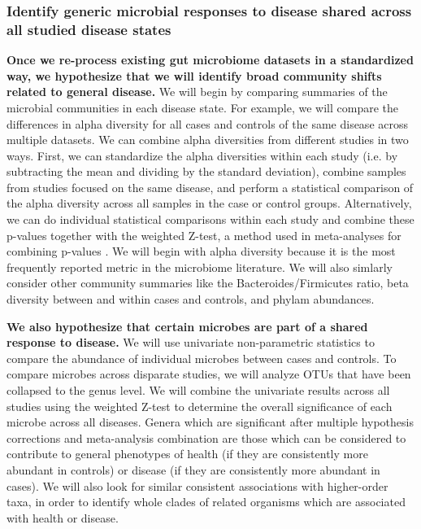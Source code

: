 \documentclass[12pt]{article}
\begin{document}
\subsubsection{Identify generic microbial responses to disease shared across all studied disease states}\label{sec:indep_studies}
\textbf{Once we re-process existing
gut microbiome datasets in a standardized way, we hypothesize that we
will identify broad community shifts related to general disease.}
We will begin by comparing summaries of the microbial communities in 
each disease state. For example, we will compare the differences in alpha diversity 
for all cases and controls of the same disease across multiple datasets. 
We can combine alpha diversities from different studies in two ways.
First, we can standardize the alpha diversities within each study
(i.e. by subtracting the mean and dividing by the standard deviation), combine samples from
studies focused on the same disease, and perform a statistical comparison of
the alpha diversity across all samples in the case or control groups.
 Alternatively, we can
do individual statistical comparisons within each study and combine these p-values
together with the weighted Z-test, a method used in meta-analyses for combining p-values \cite{zavkin-ztest-2011}. We will begin with alpha diversity
because it is the most frequently reported metric in the microbiome literature. We will also simlarly consider
other community summaries like the Bacteroides/Firmicutes ratio, beta diversity between and within cases and controls, 
and phylam abundances.

\textbf{We also hypothesize that certain microbes are part of a shared response to disease.} We will use univariate non-parametric statistics to compare the
abundance of individual microbes between cases and controls. 
To compare microbes across disparate studies, we will analyze OTUs
that have been collapsed to the genus level.
We will combine the univariate results across all studies using 
the weighted Z-test \cite{zavkin-ztest-2011} to determine the overall significance
of each microbe across all diseases. 
Genera which are significant after multiple hypothesis corrections
and meta-analysis combination are those which can be considered
to contribute to general phenotypes of health (if they are
consistently more abundant in controls) or disease (if they are
consistently more abundant in cases). We will also look for
similar consistent associations with higher-order taxa, in order
to identify whole clades of related organisms which are 
associated with health or disease.
\end{document}
